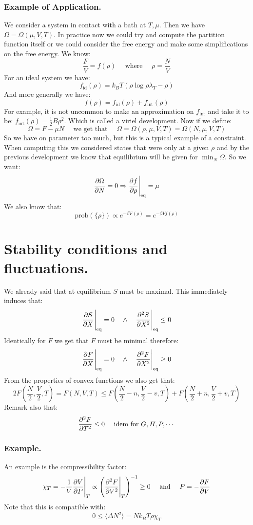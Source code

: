 \documentclass[10pt,a4paper]{book}
\begin{document}
\subsubsection{Example of Application.}
We consider a system in contact with a bath at $T, \mu$. Then we have $\Omega = \Omega(\mu, V, T)$. In practice now we could try and compute the partition function itself or we could consider the free energy and make some simplifications on the free energy. We know:
\[
\frac{F}{V} = f(\rho) \quad \text{ where } \quad \rho = \frac{N}{V}
\]
For an ideal system we have:
\[
f_\text{id}(\rho) = k_B T (\rho \log \rho \lambda_T - \rho)
\]
And more generally we have:
\[
f(\rho) = f_\text{id}(\rho) + f_\text{int}(\rho)
\]
For example, it is not uncommon to make an approximation on $f_\text{int}$ and take it to be: $f_\text{int}(\rho) = \frac{1}{2}B \rho^2$. Which is called a viriel development. Now if we define:
\[
\Omega = F - \mu N \quad \text{ we get that } \quad \Omega = \Omega(\rho, \mu, V, T) = \Omega(N, \mu, V, T)
\]
So we have on parameter too much, but this is a typical example of a constraint. When computing this we considered states that were only at a given $\rho$ and by the previous development we know that equilibrium will be given for $\min_N \Omega$. So we want:
\[
\pdv{\Omega}{N} = 0 \Rightarrow \pdv{f}{\rho}\Bigg|_\text{eq} = \mu 
\]
We also know that:
\[
\text{prob}(\{\rho\}) \propto e^{-\beta F(\rho)} = e^{-\beta V f(\rho)}
\]

\section{Stability conditions and fluctuations.}
We already said that at equilibrium $S$ must be maximal. This immediately induces that:
\[
\pdv{S}{X}\Bigg|_\text{eq} = 0 \quad \land \quad \pdv[2]{S}{X}\Bigg|_\text{eq} \leq 0
\]
Identically for $F$ we get that $F$ must be minimal therefore:
\[
\pdv{F}{X}\Bigg|_\text{eq} = 0 \quad \land \quad \pdv[2]{F}{X}\Bigg|_\text{eq} \geq 0
\]
From the properties of convex functions we also get that:
\[
2 F(\frac{N}{2}, \frac{V}{2}, T) = F(N, V, T) \leq F(\frac{N}{2} - n, \frac{V}{2} - v, T) + F(\frac{N}{2}+ n, \frac{V}{2} + v, T)
\]
Remark also that:
\[
\pdv[2]{F}{T} \leq 0 \quad \text{ idem for } G, H, P, \cdots
\]
\subsubsection{Example.}
An example is the compressibility factor:
\[
\chi_T = -\frac{1}{V} \pdv{V}{P} \Bigg|_T \propto \left( \pdv[2]{F}{V}\Bigg|_T \right)^{-1} \geq 0 \quad \text{ and } \quad P = -\pdv{F}{V}
\]
Note that this is compatible with:
\[
0 \leq \langle\Delta N^2 \rangle = N k_B T \rho \chi_T
\]
\end{document}
